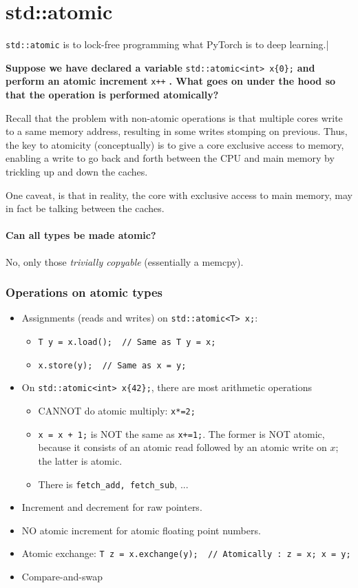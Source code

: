 \chapter{std::atomic}

\verb|std::atomic| is to lock-free programming what PyTorch is to deep learning.|

\bigskip
\noindent
\textbf{Suppose we have declared a variable} \verb|std::atomic<int> x{0};| \textbf{ and perform an atomic increment } \verb|x++| \textbf{. What goes on under the hood so that the operation is performed atomically?}

Recall that the problem with non-atomic operations is that multiple cores write to a same memory address, resulting in some writes stomping on previous. Thus, the key to atomicity (conceptually) is to give a core exclusive access to memory, enabling a write to go back and forth between the CPU and main memory by trickling up and down the caches.

One caveat, is that in reality, the core with exclusive access to main memory, may in fact be talking between the caches.

\subsubsection{Can all types be made atomic?}
No, only those \textit{trivially copyable} (essentially a memcpy).

\subsection{Operations on atomic types}
\begin{itemize}
    \item Assignments (reads and writes) on \verb|std::atomic<T> x;|:
    \begin{itemize}
        \item \verb|T y = x.load();  // Same as T y = x;|
        \item \verb|x.store(y);  // Same as x = y;|
    \end{itemize}
    \item On \verb|std::atomic<int> x{42};|, there are most arithmetic operations
    \begin{itemize}
        \item CANNOT do atomic multiply: \verb|x*=2;|
        \item \verb|x = x + 1;| is NOT the same as \verb|x+=1;|. The former is NOT atomic, because it consists of an atomic read followed by an atomic write on $x$; the latter is atomic.
        \item There is \verb|fetch_add, fetch_sub|, ...
    \end{itemize}
    \item Increment and decrement for raw pointers.
    \item NO atomic increment for atomic floating point numbers.
    \item Atomic exchange: \verb|T z = x.exchange(y);  // Atomically : z = x; x = y;|
    \item Compare-and-swap
\end{itemize}

